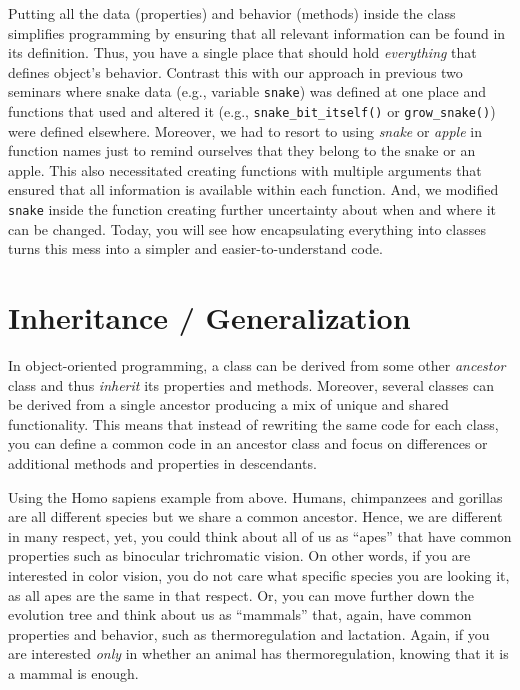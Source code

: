 \documentclass[
]{book}
\begin{document}
Putting all the data (properties) and behavior (methods) inside the class simplifies programming by ensuring that all relevant information can be found in its definition. Thus, you have a single place that should hold \emph{everything} that defines object's behavior. Contrast this with our approach in previous two seminars where snake data (e.g., variable \texttt{snake}) was defined at one place and functions that used and altered it (e.g., \texttt{snake\_bit\_itself()} or \texttt{grow\_snake()}) were defined elsewhere. Moreover, we had to resort to using \emph{snake} or \emph{apple} in function names just to remind ourselves that they belong to the snake or an apple. This also necessitated creating functions with multiple arguments that ensured that all information is available within each function. And, we modified \texttt{snake} inside the function creating further uncertainty about when and where it can be changed. Today, you will see how encapsulating everything into classes turns this mess into a simpler and easier-to-understand code.

\hypertarget{inheritance-generalization}{%
\section{Inheritance / Generalization}\label{inheritance-generalization}}

In object-oriented programming, a class can be derived from some other \emph{ancestor} class and thus \emph{inherit} its properties and methods. Moreover, several classes can be derived from a single ancestor producing a mix of unique and shared functionality. This means that instead of rewriting the same code for each class, you can define a common code in an ancestor class and focus on differences or additional methods and properties in descendants.

Using the Homo sapiens example from above. Humans, chimpanzees and gorillas are all different species but we share a common ancestor. Hence, we are different in many respect, yet, you could think about all of us as ``apes'' that have common properties such as binocular trichromatic vision. On other words, if you are interested in color vision, you do not care what specific species you are looking it, as all apes are the same in that respect. Or, you can move further down the evolution tree and think about us as ``mammals'' that, again, have common properties and behavior, such as thermoregulation and lactation. Again, if you are interested \emph{only} in whether an animal has thermoregulation, knowing that it is a mammal is enough.
\end{document}
